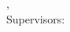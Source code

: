 \AddToShipoutPicture*{\TitleWatermark}%
\hfill
\vfill
{
	\small
	\textbf{\thesisName} \\
	\textit{\thesisTitle} \\
	\thesisSubject, \thesisDate \\
	Supervisors: \thesisInternalSupervisor \\[1.5em]
	\textbf{\thesisUniversity} \\
	\textit{\thesisFaculty} \\
	\thesisInstitute \\
	\thesisAddress \\
	\thesisPostal\ \thesisCity
}
